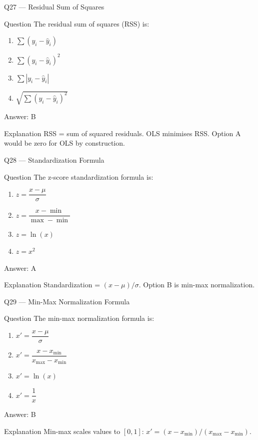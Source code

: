 \documentclass[aspectratio=169,8pt]{beamer}
\begin{document}
	\begin{frame}{Q27 --- Residual Sum of Squares}
		\begin{block}{Question}
			The residual sum of squares (RSS) is:
			\begin{enumerate}
				\item $\sum (y_i - \hat{y}_i)$
				\item $\sum (y_i - \hat{y}_i)^2$
				\item $\sum |y_i - \hat{y}_i|$
				\item $\sqrt{\sum (y_i - \hat{y}_i)^2}$
			\end{enumerate}
		\end{block}
		\begin{exampleblock}{Answer: B}\end{exampleblock}
		\begin{block}{Explanation}
			RSS = sum of squared residuals. OLS minimises RSS. Option A would be zero for OLS by construction.
		\end{block}
	\end{frame}
	
	\begin{frame}{Q28 --- Standardization Formula}
		\begin{block}{Question}
			The z-score standardization formula is:
			\begin{enumerate}
				\item $z = \dfrac{x - \mu}{\sigma}$
				\item $z = \dfrac{x - \min}{\max - \min}$
				\item $z = \ln(x)$
				\item $z = x^2$
			\end{enumerate}
		\end{block}
		\begin{exampleblock}{Answer: A}\end{exampleblock}
		\begin{block}{Explanation}
			Standardization = $(x-\mu)/\sigma$. Option B is min-max normalization.
		\end{block}
	\end{frame}
	
	\begin{frame}{Q29 --- Min-Max Normalization Formula}
		\begin{block}{Question}
			The min-max normalization formula is:
			\begin{enumerate}
				\item $x' = \dfrac{x - \mu}{\sigma}$
				\item $x' = \dfrac{x - x_{\min}}{x_{\max} - x_{\min}}$
				\item $x' = \ln(x)$
				\item $x' = \dfrac{1}{x}$
			\end{enumerate}
		\end{block}
		\begin{exampleblock}{Answer: B}\end{exampleblock}
		\begin{block}{Explanation}
			Min-max scales values to $[0,1]$: $x' = (x - x_{\min})/(x_{\max} - x_{\min})$.
		\end{block}
	\end{frame}
	
\end{document}
